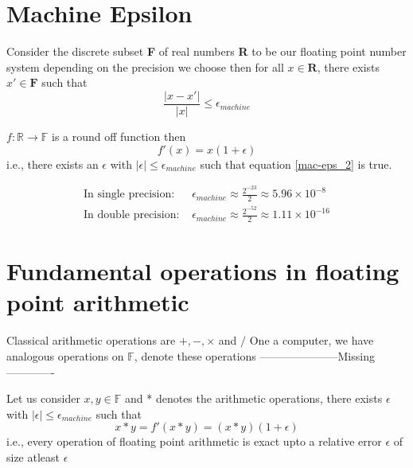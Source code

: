 \documentclass{article}
\begin{document}
\fontsize{14pt}{18pt}\selectfont

\section*{Machine Epsilon}
\label{sec:machine-epsilon}

Consider the discrete subset \textbf{F} of real numbers \textbf{R} to be our floating point number system depending on the precision we choose then for all $x \in \mathbf{R}$, there exists $x' \in \mathbf{F}$ such that
\begin{equation}\label{mac-eps_1}
  \frac{|x - x'|}{|x|} \leq \epsilon_{machine}
\end{equation}

$f:\mathbb{R} \rightarrow \mathbb{F}$ is a round off function then 
\begin{equation}\label{mac-eps_2}
  f'(x) = x(1 + \epsilon)
\end{equation}
i.e., there exists an $\epsilon$ with $|\epsilon| \leq \epsilon_{machine}$ such that equation \ref{mac-eps_2} is true.

\begin{equation}
  \begin{split}
    \text{In single precision: } &\epsilon_{machine} \approx \frac{2^{-23}}{2} \approx 5.96 \times 10^{-8}\\
    \text{In double precision: } &\epsilon_{machine} \approx \frac{2^{-52}}{2} \approx 1.11 \times 10^{-16}
  \end{split}
\end{equation}

\section*{Fundamental operations in floating point arithmetic}
\label{sec:fun-op}

Classical arithmetic operations are $+,-,\times$ and $/$
\newline
One a computer, we have analogous operations on $\mathbb{F}$, denote these operations
---------------------Missing-------------
\newline

Let us consider $x, y \in \mathbb{F}$ and * denotes the arithmetic operations, there exists $\epsilon$ with $|\epsilon| \leq \epsilon_{machine}$ such that
\begin{equation}
  x * y = f'(x * y) = (x * y)(1 + \epsilon)
\end{equation}
i.e., every operation of floating point arithmetic is exact upto a relative error $\epsilon$ of size atleast $\epsilon$
\end{document}
